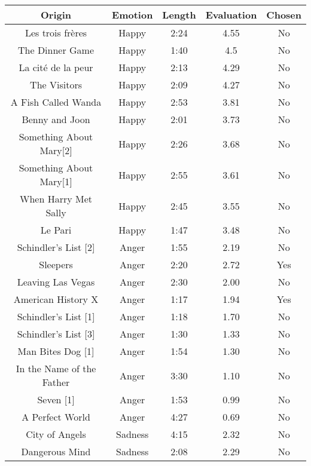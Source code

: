 \begin{table}[]
    \centering
    \begin{tabular}{|c|c|c|c|c|}
        \hline
         Origin & Emotion & Length & Evaluation & Chosen  \\ \hline
         Les trois frères & Happy & 2:24 & 4.55    & No \\ \hline
         The Dinner Game & Happy & 1:40 & 4.5    & No \\ \hline
         La cité de la peur & Happy & 2:13 & 4.29   & No \\ \hline
         The Visitors & Happy & 2:09 & 4.27   & No \\ \hline
         A Fish Called Wanda & Happy & 2:53 & 3.81   & No \\ \hline
         Benny and Joon & Happy & 2:01 & 3.73   & No \\ \hline
         Something About Mary[2] & Happy & 2:26 & 3.68   & No \\ \hline
         Something About Mary[1] & Happy & 2:55 & 3.61   & No \\ \hline
         When Harry Met Sally & Happy & 2:45 & 3.55   & No \\ \hline
         Le Pari & Happy & 1:47 & 3.48   & No \\ \hline
         Schindler’s List [2] & Anger & 1:55 & 2.19   & No \\ \hline
         Sleepers & Anger & 2:20 & 2.72   & Yes \\ \hline
         Leaving Las Vegas & Anger & 2:30 & 2.00   & No \\ \hline
         American History X & Anger & 1:17 & 1.94   & Yes \\ \hline
         Schindler’s List [1] & Anger & 1:18 & 1.70   & No \\ \hline
        Schindler’s List [3] & Anger & 1:30 & 1.33   & No \\ \hline
         Man Bites Dog [1] & Anger & 1:54 & 1.30   & No \\ \hline
         In the Name of the Father & Anger & 3:30 & 1.10   & No \\ \hline
         Seven [1] & Anger & 1:53 & 0.99   & No \\ \hline
         A Perfect World & Anger & 4:27 & 0.69   & No \\ \hline
         City of Angels & Sadness & 4:15 & 2.32   & No \\ \hline
         Dangerous Mind & Sadness & 2:08 & 2.29   & No \\ \hline

\end{tabular}
\end{table}
